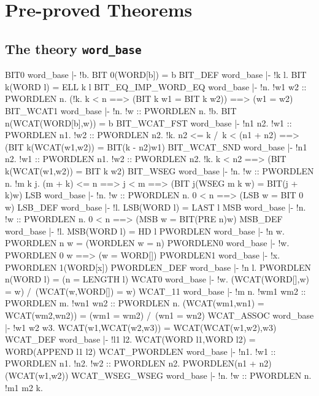 \chapter{Pre-proved Theorems}

\section{The theory {\tt word\_base}}
\THEOREM BIT0 word\_base
|- !b. BIT 0(WORD[b]) = b
\ENDTHEOREM
\THEOREM BIT\_DEF word\_base
|- !k l. BIT k(WORD l) = ELL k l
\ENDTHEOREM
\THEOREM BIT\_EQ\_IMP\_WORD\_EQ word\_base
|- !n.
    !w1 w2 :: PWORDLEN n.
     (!k. k < n ==> (BIT k w1 = BIT k w2)) ==> (w1 = w2)
\ENDTHEOREM
\THEOREM BIT\_WCAT1 word\_base
|- !n. !w :: PWORDLEN n. !b. BIT n(WCAT(WORD[b],w)) = b
\ENDTHEOREM
\THEOREM BIT\_WCAT\_FST word\_base
|- !n1 n2.
    !w1 :: PWORDLEN n1.
     !w2 :: PWORDLEN n2.
      !k.
       n2 <= k /\ k < (n1 + n2) ==> (BIT k(WCAT(w1,w2)) = BIT(k - n2)w1)
\ENDTHEOREM
\THEOREM BIT\_WCAT\_SND word\_base
|- !n1 n2.
    !w1 :: PWORDLEN n1.
     !w2 :: PWORDLEN n2. !k. k < n2 ==> (BIT k(WCAT(w1,w2)) = BIT k w2)
\ENDTHEOREM
\THEOREM BIT\_WSEG word\_base
|- !n.
    !w :: PWORDLEN n.
     !m k j.
      (m + k) <= n ==> j < m ==> (BIT j(WSEG m k w) = BIT(j + k)w)
\ENDTHEOREM
\THEOREM LSB word\_base
|- !n. !w :: PWORDLEN n. 0 < n ==> (LSB w = BIT 0 w)
\ENDTHEOREM
\THEOREM LSB\_DEF word\_base
|- !l. LSB(WORD l) = LAST l
\ENDTHEOREM
\THEOREM MSB word\_base
|- !n. !w :: PWORDLEN n. 0 < n ==> (MSB w = BIT(PRE n)w)
\ENDTHEOREM
\THEOREM MSB\_DEF word\_base
|- !l. MSB(WORD l) = HD l
\ENDTHEOREM
\THEOREM PWORDLEN word\_base
|- !n w. PWORDLEN n w = (WORDLEN w = n)
\ENDTHEOREM
\THEOREM PWORDLEN0 word\_base
|- !w. PWORDLEN 0 w ==> (w = WORD[])
\ENDTHEOREM
\THEOREM PWORDLEN1 word\_base
|- !x. PWORDLEN 1(WORD[x])
\ENDTHEOREM
\THEOREM PWORDLEN\_DEF word\_base
|- !n l. PWORDLEN n(WORD l) = (n = LENGTH l)
\ENDTHEOREM
\THEOREM WCAT0 word\_base
|- !w. (WCAT(WORD[],w) = w) /\ (WCAT(w,WORD[]) = w)
\ENDTHEOREM
\THEOREM WCAT\_11 word\_base
|- !m n.
    !wm1 wm2 :: PWORDLEN m.
     !wn1 wn2 :: PWORDLEN n.
      (WCAT(wm1,wn1) = WCAT(wm2,wn2)) = (wm1 = wm2) /\ (wn1 = wn2)
\ENDTHEOREM
\THEOREM WCAT\_ASSOC word\_base
|- !w1 w2 w3. WCAT(w1,WCAT(w2,w3)) = WCAT(WCAT(w1,w2),w3)
\ENDTHEOREM
\THEOREM WCAT\_DEF word\_base
|- !l1 l2. WCAT(WORD l1,WORD l2) = WORD(APPEND l1 l2)
\ENDTHEOREM
\THEOREM WCAT\_PWORDLEN word\_base
|- !n1.
    !w1 :: PWORDLEN n1.
     !n2. !w2 :: PWORDLEN n2. PWORDLEN(n1 + n2)(WCAT(w1,w2))
\ENDTHEOREM
\THEOREM WCAT\_WSEG\_WSEG word\_base
|- !n.
    !w :: PWORDLEN n.
     !m1 m2 k.
